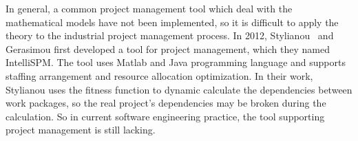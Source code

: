 In general, a common project management tool which deal with
the mathematical models have not been implemented, so it is difficult to apply
the theory to the industrial project management process. In 2012, Stylianou~\cite{stylianou} and
Gerasimou first developed a tool for project management, which they named
IntelliSPM. The tool uses Matlab and Java programming language and
supports staffing arrangement and resource allocation optimization. In
their work, Stylianou uses the fitness function to dynamic calculate the
dependencies between work packages, so the real project's dependencies may be
broken during the calculation. So in current software engineering practice, the
tool supporting project management is still lacking.

